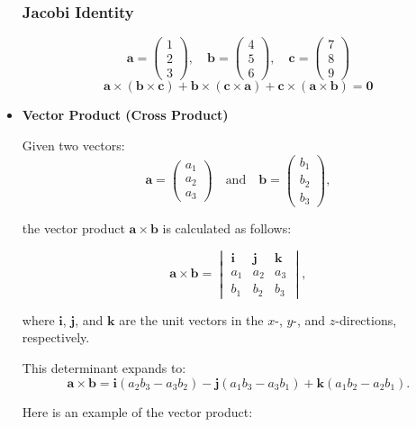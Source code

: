 \documentclass[a4paper,12pt]{article}
\begin{document}
\begin{itemize}[leftmargin=*]
\subsubsection*{Jacobi Identity}
\[
\mathbf{a} = \begin{pmatrix} 1 \\ 2 \\ 3 \end{pmatrix}, \quad \mathbf{b} = \begin{pmatrix} 4 \\ 5 \\ 6 \end{pmatrix}, \quad \mathbf{c} = \begin{pmatrix} 7 \\ 8 \\ 9 \end{pmatrix}
\]
\[
\mathbf{a} \times (\mathbf{b} \times \mathbf{c}) + \mathbf{b} \times (\mathbf{c} \times \mathbf{a}) + \mathbf{c} \times (\mathbf{a} \times \mathbf{b}) = \mathbf{0}
\]

\item \textbf{Vector Product (Cross Product)}

Given two vectors:
\[
\mathbf{a} = \begin{pmatrix} a_1 \\ a_2 \\ a_3 \end{pmatrix}
\quad \text{and} \quad
\mathbf{b} = \begin{pmatrix} b_1 \\ b_2 \\ b_3 \end{pmatrix},
\]

the vector product \(\mathbf{a} \times \mathbf{b}\) is calculated as follows:

\[
\mathbf{a} \times \mathbf{b} = \begin{vmatrix}
\mathbf{i} & \mathbf{j} & \mathbf{k} \\
a_1 & a_2 & a_3 \\
b_1 & b_2 & b_3
\end{vmatrix},
\]

where \(\mathbf{i}\), \(\mathbf{j}\), and \(\mathbf{k}\) are the unit vectors in the \(x\)-, \(y\)-, and \(z\)-directions, respectively.

This determinant expands to:
\[
\mathbf{a} \times \mathbf{b} = \mathbf{i}(a_2 b_3 - a_3 b_2) - \mathbf{j}(a_1 b_3 - a_3 b_1) + \mathbf{k}(a_1 b_2 - a_2 b_1).
\]

Here is an example of the vector product:


\end{itemize}
\end{document}
